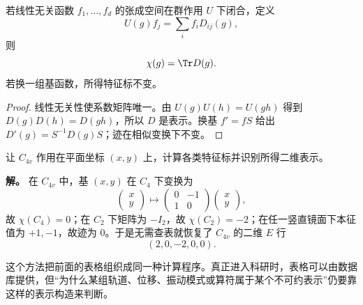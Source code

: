 \begin{proposition}[不变函数空间的特征标重建]
若线性无关函数 $f_1,\dots,f_d$ 的张成空间在群作用 $U$ 下闭合，定义
\[
U(g)f_j=\sum_i f_i D_{ij}(g),
\]
则
\[
\chi(g)=\Tr D(g).
\]
若换一组基函数，所得特征标不变。
\end{proposition}
\begin{proof}
线性无关性使系数矩阵唯一。由 $U(g)U(h)=U(gh)$ 得到 $D(g)D(h)=D(gh)$，所以 $D$ 是表示。换基 $f'=fS$ 给出 $D'(g)=S^{-1}D(g)S$；迹在相似变换下不变。
\end{proof}

\begin{example}[$C_{4v}$ 中的平面坐标表示]
让 $C_{4v}$ 作用在平面坐标 $(x,y)$ 上，计算各类特征标并识别所得二维表示。

\textbf{解。} 在 $C_{4v}$ 中，基 $(x,y)$ 在 $C_4$ 下变换为
\[
\begin{pmatrix}x\\y\end{pmatrix}
\mapsto
\begin{pmatrix}0&-1\\1&0\end{pmatrix}
\begin{pmatrix}x\\y\end{pmatrix},
\]
故 $\chi(C_4)=0$；在 $C_2$ 下矩阵为 $-I_2$，故 $\chi(C_2)=-2$；在任一竖直镜面下本征值为 $+1,-1$，故迹为 $0$。于是无需查表就恢复了 $C_{4v}$ 的二维 $E$ 行
\[
(2,0,-2,0,0).
\]
\end{example}

这个方法把前面的表格组织成同一种计算程序。真正进入科研时，表格可以由数据库提供，但“为什么某组轨道、位移、振动模式或算符属于某个不可约表示”仍要靠这样的表示构造来判断。
